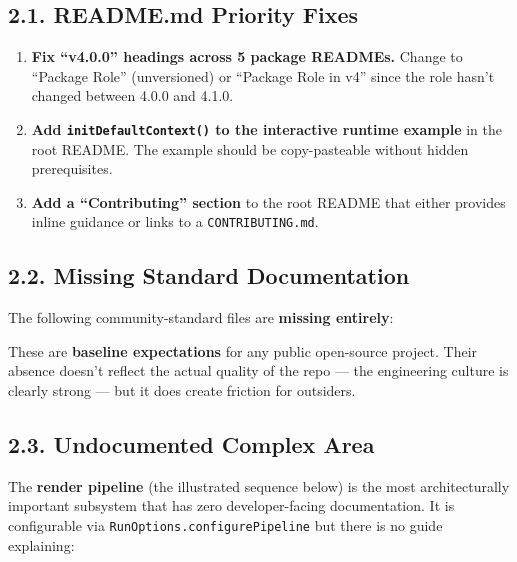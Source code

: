 \subsection{2.1. README.md Priority Fixes}\label{record-412-readme.md-priority-fixes}

\begin{enumerate}
\def\labelenumi{\arabic{enumi}.}
\item
  \textbf{Fix ``v4.0.0'' headings across 5 package READMEs.} Change to ``Package Role'' (unversioned) or ``Package Role in v4'' since the role hasn't changed between 4.0.0 and 4.1.0.
\item
  \textbf{Add \texttt{i\allowbreak{}n\allowbreak{}i\allowbreak{}t\allowbreak{}D\allowbreak{}e\allowbreak{}f\allowbreak{}a\allowbreak{}u\allowbreak{}l\allowbreak{}t\allowbreak{}C\allowbreak{}o\allowbreak{}n\allowbreak{}t\allowbreak{}e\allowbreak{}x\allowbreak{}t\allowbreak{}(\allowbreak{})} to the interactive runtime example} in the root README. The example should be copy-pasteable without hidden prerequisites.
\item
  \textbf{Add a ``Contributing'' section} to the root README that either provides inline guidance or links to a \texttt{C\allowbreak{}O\allowbreak{}N\allowbreak{}T\allowbreak{}R\allowbreak{}I\allowbreak{}B\allowbreak{}U\allowbreak{}T\allowbreak{}I\allowbreak{}N\allowbreak{}G\allowbreak{}.\allowbreak{}m\allowbreak{}d}.
\end{enumerate}

\subsection{2.2. Missing Standard Documentation}\label{record-412-missing-standard-documentation}

The following community-standard files are \textbf{missing entirely}:



These are \textbf{baseline expectations} for any public open-source project. Their absence doesn't reflect the actual quality of the repo --- the engineering culture is clearly strong --- but it does create friction for outsiders.

\subsection{2.3. Undocumented Complex Area}\label{record-412-undocumented-complex-area}

The \textbf{render pipeline} (the illustrated sequence below) is the most architecturally important subsystem that has zero developer-facing documentation. It is configurable via \texttt{R\allowbreak{}u\allowbreak{}n\allowbreak{}O\allowbreak{}p\allowbreak{}t\allowbreak{}i\allowbreak{}o\allowbreak{}n\allowbreak{}s\allowbreak{}.\allowbreak{}c\allowbreak{}o\allowbreak{}n\allowbreak{}f\allowbreak{}i\allowbreak{}g\allowbreak{}u\allowbreak{}r\allowbreak{}e\allowbreak{}P\allowbreak{}i\allowbreak{}p\allowbreak{}e\allowbreak{}l\allowbreak{}i\allowbreak{}n\allowbreak{}e} but there is no guide explaining:


